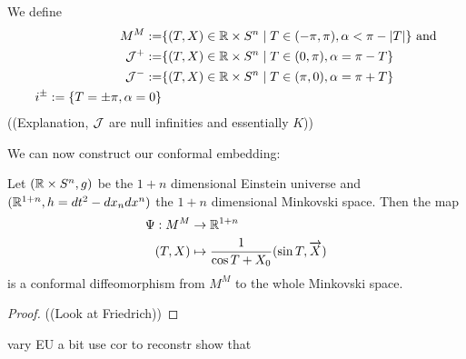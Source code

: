 We define 
\begin{align*}
    M^M:=&\{(T,X)\in \mathbb{R}\times S^n \mid T\in(-\pi,\pi), \alpha<\pi-\lvert T\rvert\} \text{ and}\\
    {\mathcal{J}}^+:=&\{(T,X)\in \mathbb{R}\times S^n \mid T\in(0,\pi), \alpha = \pi - T\}\\
    {\mathcal{J}}^-:=&\{(T,X)\in \mathbb{R}\times S^n \mid T\in(\pi,0), \alpha = \pi + T\}\\
    i^\pm := \{T=\pm\pi,\alpha=0\}
\end{align*}
((Explanation, ${\mathcal{J}}$ are null infinities and essentially $K$))

We can now construct our conformal embedding:
\begin{proposition}
Let $(\mathbb{R}\times S^n,g)$ be the $1+n$ dimensional Einstein universe and $(\mathbb{R}^{1+n},h=dt^2-dx_ndx^n)$ the $1+n$ dimensional Minkovski space. Then the map 
\begin{align}
    \Psi:M^M &\to \mathbb{R}^{1+n}\\
    (T,X) &\mapsto\frac{1}{\cos T + X_0}(\sin T,\overrightarrow{X})
\end{align}
is a conformal diffeomorphism from $M^M$ to the whole Minkovski space.
\end{proposition}
\begin{proof}
    ((Look at Friedrich))
\end{proof}


\begin{example}
    vary EU a bit use cor to reconstr show that 
\end{example}
